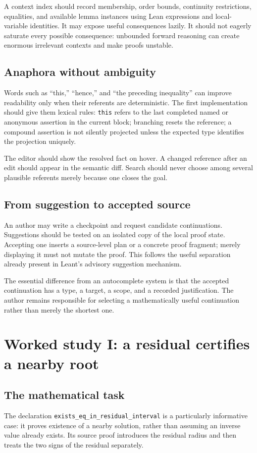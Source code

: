 \documentclass[11pt,a4paper]{article}
\newcommand{\code}[1]{\nolinkurl{#1}}
\theoremstyle{definition}
\theoremstyle{remark}
\numberwithin{equation}{section}
\begin{document}
A context index should record membership, order bounds, continuity restrictions, equalities, and available lemma instances using Lean expressions and local-variable identities. It may expose useful consequences lazily. It should not eagerly saturate every possible consequence: unbounded forward reasoning can create enormous irrelevant contexts and make proofs unstable.

\subsection{Anaphora without ambiguity}
Words such as ``this,'' ``hence,'' and ``the preceding inequality'' can improve readability only when their referents are deterministic. The first implementation should give them lexical rules: \code{this} refers to the last completed named or anonymous assertion in the current block; branching resets the reference; a compound assertion is not silently projected unless the expected type identifies the projection uniquely.

The editor should show the resolved fact on hover. A changed reference after an edit should appear in the semantic diff. Search should never choose among several plausible referents merely because one closes the goal.

\subsection{From suggestion to accepted source}
An author may write a checkpoint and request candidate continuations. Suggestions should be tested on an isolated copy of the local proof state. Accepting one inserts a source-level plan or a concrete proof fragment; merely displaying it must not mutate the proof. This follows the useful separation already present in Leant's advisory suggestion mechanism.\cite{l-main}

The essential difference from an autocomplete system is that the accepted continuation has a type, a target, a scope, and a recorded justification. The author remains responsible for selecting a mathematically useful continuation rather than merely the shortest one.

\section{Worked study I: a residual certifies a nearby root}
\label{sec:residual}
\subsection{The mathematical task}
The declaration \code{exists_eq_in_residual_interval} is a particularly informative case: it proves existence of a nearby solution, rather than assuming an inverse value already exists. Its source proof introduces the residual radius and then treats the two signs of the residual separately.\cite{p-mean}
\end{document}
